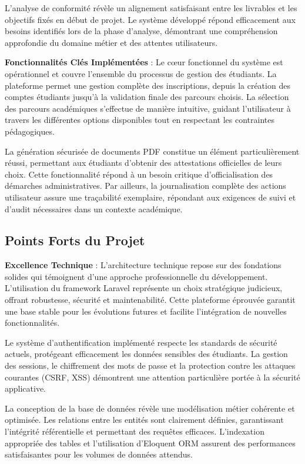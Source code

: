 \documentclass[12pt,a4paper]{report}
\begin{document}
L'analyse de conformité révèle un alignement satisfaisant entre les livrables et les objectifs fixés en début de projet. Le système développé répond efficacement aux besoins identifiés lors de la phase d'analyse, démontrant une compréhension approfondie du domaine métier et des attentes utilisateurs.

\textbf{Fonctionnalités Clés Implémentées} : Le cœur fonctionnel du système est opérationnel et couvre l'ensemble du processus de gestion des étudiants. La plateforme permet une gestion complète des inscriptions, depuis la création des comptes étudiants jusqu'à la validation finale des parcours choisis. La sélection des parcours académiques s'effectue de manière intuitive, guidant l'utilisateur à travers les différentes options disponibles tout en respectant les contraintes pédagogiques.

La génération sécurisée de documents PDF constitue un élément particulièrement réussi, permettant aux étudiants d'obtenir des attestations officielles de leurs choix. Cette fonctionnalité répond à un besoin critique d'officialisation des démarches administratives. Par ailleurs, la journalisation complète des actions utilisateur assure une traçabilité exemplaire, répondant aux exigences de suivi et d'audit nécessaires dans un contexte académique.

\subsection{Points Forts du Projet}

\textbf{Excellence Technique} : L'architecture technique repose sur des fondations solides qui témoignent d'une approche professionnelle du développement. L'utilisation du framework Laravel représente un choix stratégique judicieux, offrant robustesse, sécurité et maintenabilité. Cette plateforme éprouvée garantit une base stable pour les évolutions futures et facilite l'intégration de nouvelles fonctionnalités.

Le système d'authentification implémenté respecte les standards de sécurité actuels, protégeant efficacement les données sensibles des étudiants. La gestion des sessions, le chiffrement des mots de passe et la protection contre les attaques courantes (CSRF, XSS) démontrent une attention particulière portée à la sécurité applicative.

La conception de la base de données révèle une modélisation métier cohérente et optimisée. Les relations entre les entités sont clairement définies, garantissant l'intégrité référentielle et permettant des requêtes efficaces. L'indexation appropriée des tables et l'utilisation d'Eloquent ORM assurent des performances satisfaisantes pour les volumes de données attendus.
\end{document}
